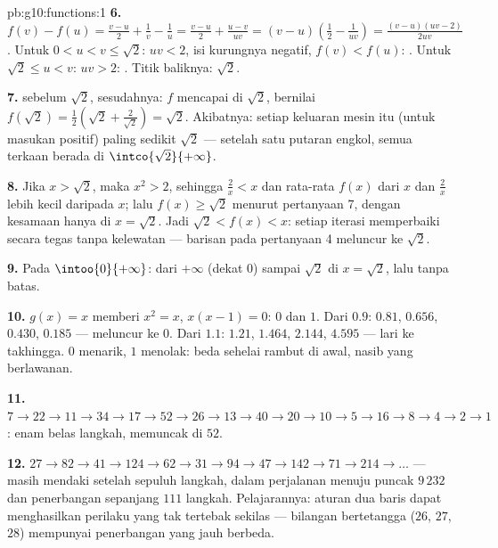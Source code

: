 \begin{solution}{pb:g10:functions:1}
\textbf{6.} $f(v) - f(u) = \frac{v - u}{2} + \frac1v - \frac1u
= \frac{v - u}{2} + \frac{u - v}{uv}
= (v - u)\left(\frac12 - \frac{1}{uv}\right)
= \frac{(v - u)(uv - 2)}{2uv}$. Untuk $0 < u < v \leq \sqrt2$:
$uv < 2$, isi kurungnya negatif, $f(v) < f(u)$: .
Untuk $\sqrt2 \leq u < v$: $uv > 2$: . Titik baliknya:
$\sqrt2$.

\textbf{7.}  sebelum $\sqrt2$,  sesudahnya: $f$
mencapai  di $\sqrt2$, bernilai
$f(\sqrt2) = \frac12\left(\sqrt2 + \frac{2}{\sqrt2}\right)
= \sqrt2$. Akibatnya: setiap keluaran mesin itu (untuk masukan
positif) paling sedikit $\sqrt2$ --- setelah satu putaran engkol,
semua terkaan berada di $\intco{\sqrt2}{+\infty}$.

\textbf{8.} Jika $x > \sqrt2$, maka $x^2 > 2$, sehingga
$\frac2x < x$ dan rata-rata $f(x)$ dari $x$ dan $\frac2x$
lebih kecil daripada $x$; lalu $f(x) \geq \sqrt2$ menurut pertanyaan 7,
dengan kesamaan hanya di $x = \sqrt2$. Jadi
$\sqrt2 < f(x) < x$: setiap iterasi memperbaiki secara tegas tanpa
kelewatan --- barisan pada pertanyaan 4 meluncur  ke
$\sqrt2$.

\textbf{9.} Pada $\intoo{0}{+\infty}$:  dari
$+\infty$ (dekat $0$) sampai  $\sqrt2$ di
$x = \sqrt2$, lalu  tanpa batas.

\textbf{10.} $g(x) = x$ memberi $x^2 = x$, $x(x - 1) = 0$:  $0$ dan $1$. Dari $0.9$: $0.81$, $0.656$, $0.430$,
$0.185$ --- meluncur ke $0$. Dari $1.1$: $1.21$, $1.464$,
$2.144$, $4.595$ --- lari ke takhingga.  $0$
menarik, $1$ menolak: beda sehelai rambut di awal, nasib yang
berlawanan.

\textbf{11.} $7 \to 22 \to 11 \to 34 \to 17 \to 52 \to 26 \to
13 \to 40 \to 20 \to 10 \to 5 \to 16 \to 8 \to 4 \to 2 \to 1$:
enam belas langkah, memuncak di $52$.

\textbf{12.} $27 \to 82 \to 41 \to 124 \to 62 \to 31 \to 94 \to
47 \to 142 \to 71 \to 214 \to \dots$ --- masih mendaki setelah
sepuluh langkah, dalam perjalanan menuju puncak $9\,232$ dan
penerbangan sepanjang $111$ langkah. Pelajarannya: aturan dua baris
dapat menghasilkan perilaku yang tak tertebak sekilas ---
bilangan bertetangga ($26$, $27$, $28$)
mempunyai penerbangan yang jauh berbeda.


\end{solution}
